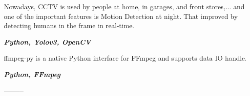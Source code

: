 \documentclass[10pt,a4paper,ragged2e,withhyper]{altacv}
\begin{document}
\medskip

\divider

\medskip

\begin{minipage}{\linewidth}
\justifying
Nowadays, CCTV is used by people at home, in garages, and front stores,... and one of the important features is Motion Detection at night. That improved by detecting humans in the frame in real-time.
\smallskip

\textit{\textbf{Python, Yolov3, OpenCV}}
\end{minipage}

\medskip

\divider

\medskip

\begin{minipage}{\linewidth}
	\justifying
	ffmpeg-py is a native Python interface for FFmpeg and supports data IO handle.
	\smallskip
	
	\textit{\textbf{Python, FFmpeg}}
\end{minipage}

\bigskip
\begin{minipage}{\linewidth}
	\centering
	\textbf{\color{accent}--------}
\end{minipage}
	
\end{document}
